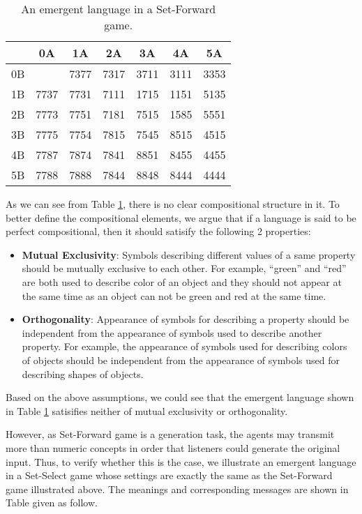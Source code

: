 \begin{table}[!h]
    \centering
    \begin{tabular}{|c|c|c|c|c|c|c|}
        \hline
           & 0A   & 1A   & 2A   & 3A   & 4A   & 5A   \\ \hline
        0B &      & 7377 & 7317 & 3711 & 3111 & 3353 \\ \hline
        1B & 7737 & 7731 & 7111 & 1715 & 1151 & 5135 \\ \hline
        2B & 7773 & 7751 & 7181 & 7515 & 1585 & 5551 \\ \hline
        3B & 7775 & 7754 & 7815 & 7545 & 8515 & 4515 \\ \hline
        4B & 7787 & 7874 & 7841 & 8851 & 8455 & 4455 \\ \hline
        5B & 7788 & 7888 & 7844 & 8848 & 8444 & 4444 \\ \hline
        \end{tabular}
    \caption{An emergent language in a Set-Forward game.}
    \label{tab4.2:emregent_langauge_generation}
\end{table}

As we can see from Table \ref{tab4.2:emregent_langauge_generation}, there is no clear compositional structure in it. To better define the compositional elements, we argue that if a language is said to be perfect compositional, then it should satisify the following 2 properties:

\begin{itemize}
    \item \textbf{Mutual Exclusivity}: Symbols describing different values of a same property should be mutually exclusive to each other. For example, ``green'' and ``red'' are both used to describe color of an object and they should not appear at the same time as an object can not be green and red at the same time.
    \item \textbf{Orthogonality}: Appearance of symbols for describing a property should be independent from the appearance of symbols used to describe another property. For example, the appearance of symbols used for describing colors of objects should be independent from the appearance of symbols used for describing shapes of objects.
\end{itemize}

Based on the above assumptions, we could see that the emergent language shown in Table \ref{tab4.2:emregent_langauge_generation} satisifies neither of mutual exclusivity or orthogonality.

However, as Set-Forward game is a generation task, the agents may transmit more than numeric concepts in order that listeners could generate the original input. Thus, to verify whether this is the case, we illustrate an emergent language in a Set-Select game whose settings are exactly the same as the Set-Forward game illustrated above. The meanings and corresponding messages are shown in Table given as follow.

